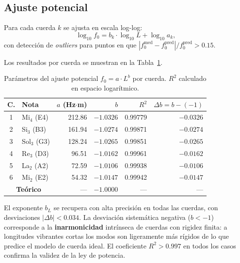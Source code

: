 \documentclass[12pt,a4paper]{article}
\begin{document}
\subsection{Ajuste potencial}

Para cada cuerda $k$ se ajusta en escala log-log:
\begin{equation}
  \log_{10}f_0 = b_k \cdot \log_{10}L + \log_{10}a_k,
\end{equation}
con detección de \emph{outliers} para puntos en que
$|f_0^\text{med} - f_0^\text{pred}|/f_0^\text{pred} > 0.15$.

Los resultados por cuerda se muestran en la Tabla~\ref{tab:fL}.

\begin{table}[H]
\centering
\caption{Parámetros del ajuste potencial $f_0 = a \cdot L^b$ por cuerda.
  $R^2$ calculado en espacio logarítmico.}
\label{tab:fL}
\smallskip
\begin{tabular}{clrrrr}
\toprule
\textbf{C.} & \textbf{Nota} & $a$ (Hz$\cdot$m) & $b$ & $R^2$ & $\Delta b = b-(-1)$\\
\midrule
1 & Mi$_4$ (E4) & 212.86 & $-1.0326$ & 0.99779 & $-0.0326$ \\
2 & Si$_3$ (B3) & 161.94 & $-1.0274$ & 0.99871 & $-0.0274$ \\
3 & Sol$_3$ (G3)& 128.24 & $-1.0265$ & 0.99851 & $-0.0265$ \\
4 & Re$_3$ (D3) & 96.51  & $-1.0162$ & 0.99961 & $-0.0162$ \\
5 & La$_2$ (A2) & 72.59  & $-1.0106$ & 0.99938 & $-0.0106$ \\
6 & Mi$_2$ (E2) & 54.32  & $-1.0147$ & 0.99942 & $-0.0147$ \\
\midrule
\multicolumn{2}{c}{\textbf{Teórico}} & — & $\mathbf{-1.0000}$ & — & — \\
\bottomrule
\end{tabular}
\end{table}

\begin{resultbox}
  El exponente $b_L$ se recupera con alta precisión en todas las cuerdas,
  con desviaciones $|\Delta b| < 0.034$. La desviación sistemática negativa
  ($b < -1$) corresponde a la \textbf{inarmonicidad} intrínseca de cuerdas
  con rigidez finita: a longitudes vibrantes cortas los modos son
  ligeramente más rígidos de lo que predice el modelo de cuerda ideal.
  El coeficiente $R^2 > 0.997$ en todos los casos confirma la validez de
  la ley de potencia.
\end{resultbox}
\end{document}
